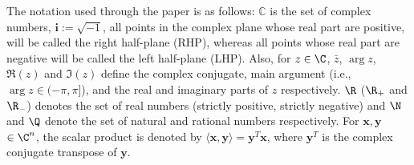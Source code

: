 \documentclass[twoside,reqno,11pt]{fcaa-var} %
\begin{document}
The notation used through the paper is as follows: $\mathbb{C}$ is the set of complex numbers, $\bm{i}:=\sqrt{-1}$, all points in the complex plane whose real part are positive, will be called the right half-plane (RHP), whereas all points whose real part are negative will be called the left half-plane (LHP). Also, for $z \in \C$, $\bar{z}$, $\arg{z}$, $\Re(z)$ and $\Im(z)$ define the complex conjugate, main argument (i.e., $\arg{z}\in(-\pi,\pi]$), and the real and imaginary parts of $z$ respectively. $\R$ ($\R_+$ and $\R_-$) denotes the set of real numbers (strictly positive, strictly negative) and $\N$ and $\Q$ denote the set of natural and rational numbers respectively. For $\mathbf{x},\mathbf{y}$ $\in {\C}^n$, the scalar product is denoted by $\langle\mathbf{x},\mathbf{y}\rangle=\mathbf{y}^T\mathbf{x}$, where $\mathbf{y}^T$ is the complex conjugate transpose of $\mathbf{y}$. 

\setcounter{section}{1}
\setcounter{equation}{0}\setcounter{theorem}{0}
\end{document}

